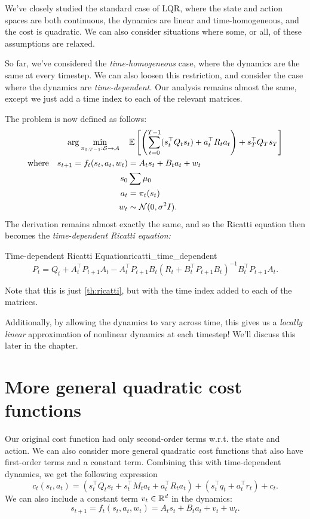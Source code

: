 \documentclass[../main/main]{subfiles}
\begin{document}
We've closely studied the standard case of LQR, where the state and action spaces are both
continuous, the dynamics are linear and time-homogeneous, and the cost is quadratic.
We can also consider situations where some, or all, of these assumptions are relaxed.

So far, we've considered the \emph{time-homogeneous} case, where the dynamics are the same at every timestep. We can also loosen this restriction, and consider the case where the dynamics are \emph{time-dependent.} Our analysis
remains almost the same, except we just add a time index to each of the relevant matrices.

The problem is now defined as follows:
\begin{align*}
    \arg \min_{\pi_{0:T-1} : \mathcal{S} \to \mathcal{A}} \quad & \operatorname*{\mathbb{E}} \left[ \left( \sum_{t=0}^{T-1} (s_t^\top Q_t s_t) + a_t^\top R_t a_t \right) + s_T^\top Q_T s_T \right] \\
    \textrm{where} \quad s_{t+1} = f_t(s_t, a_t, w_t) &= A_t s_t + B_t a_t + w_t \\
    s_0 &\sum \mu_0 \\
    a_t &= \pi_t (s_t) \\
    w_t &\sim \mathcal{N}(0, \sigma^2 I).
\end{align*}
The derivation remains almost exactly the same, and so the Ricatti equation then
becomes the \emph{time-dependent Ricatti equation:}

\begin{theorem}{Time-dependent Ricatti Equation}{ricatti_time_dependent}
    \[
        P_t = Q_t + A_t^\top P_{t+1} A_t - A_t^\top P_{t+1} B_t (R_t + B_t^\top P_{t+1} B_t)^{-1} B_t^\top P_{t+1} A_t.
    \]

    Note that this is just \autoref{th:ricatti}, but with the
    time index added to each of the matrices.
\end{theorem}

Additionally, by allowing the dynamics to vary across time,
this gives us a \emph{locally linear} approximation of nonlinear dynamics at each timestep!
We'll discuss this later in the chapter.

\section{More general quadratic cost functions}

Our original cost function had only second-order terms w.r.t. the state and action. We can also consider more general quadratic cost functions that also have first-order terms and a constant term. Combining this with
time-dependent dynamics, we get the following expression
\[
    c_t(s_t, a_t) = ( s_t^\top Q_t s_t + s_t^\top M_t a_t + a_t^\top R_t a_t ) + (s_t^\top q_t + a_t^\top r_t) + c_t.
\]
We can also include a constant term $v_t \in \mathbb{R}^d$ in the dynamics:
\[
    s_{t+1} = f_t(s_t, a_t, w_t) = A_t s_t + B_t a_t + v_t + w_t.
\]
\end{document}
